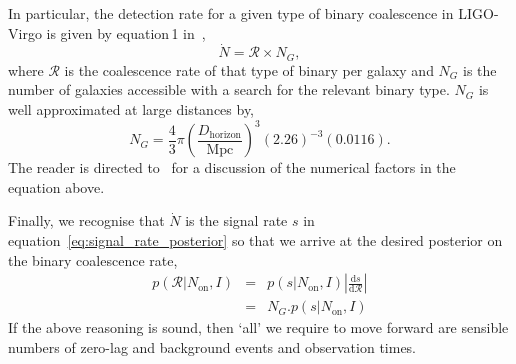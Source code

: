\documentclass[twocolumn,nofootinbib]{revtex4-1}
\newcommand{\cbcrate}{{{\mathcal R}}}
\newcommand{\diff}{{\mathrm d}}
\begin{document}
In particular,  the detection rate for a given type of binary coalescence in
LIGO-Virgo is given by equation\,1 in~\cite{rates_paper},
\begin{equation}
\dot{N} = \cbcrate \times N_G,
\end{equation}
%
where $\cbcrate$ is the coalescence rate of that type of binary per galaxy and
$N_G$ is the number of galaxies accessible with a search for the relevant binary
type.  $N_G$ is well approximated at large distances by,
%
\begin{equation}
N_G = \frac{4}{3} \pi \left( \frac{D_{\textrm{horizon}}}{\textrm{Mpc}}
\right)^3 (2.26)^{-3} (0.0116).
\end{equation}
%
The reader is directed to~\cite{rates_paper} for a discussion of the numerical
factors in the equation above.

Finally, we recognise that $\dot{N}$ is the signal rate $s$ in
equation~\ref{eq:signal_rate_posterior} so that we arrive at the desired
posterior on the binary coalescence rate, 
%
\begin{eqnarray}
p(\cbcrate|N_{\textrm{on}},I) & = & p(s|N_{\textrm{on}},I) \left|\frac{\diff
s}{\diff \cbcrate}\right| \\
& = & N_G . p(s|N_{\textrm{on}},I)
\end{eqnarray}
%
If the above reasoning is sound, then `all' we require to move forward are
sensible numbers of zero-lag and background events and observation times.
\end{document}
